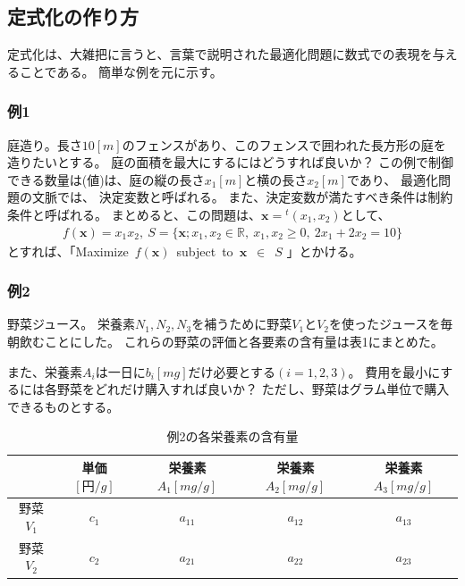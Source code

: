 \documentclass[12pt]{jarticle}
\begin{document}
\clearpage
\subsection{定式化の作り方}
定式化は、大雑把に言うと、言葉で説明された最適化問題に数式での表現を与えることである。
簡単な例を元に示す。

\subsubsection*{例1}
庭造り。長さ$10[m]$のフェンスがあり、このフェンスで囲われた長方形の庭を造りたいとする。
庭の面積を最大にするにはどうすれば良いか？
この例で制御できる数量は(値)は、庭の縦の長さ$x_1[m]$と横の長さ$x_2[m]$であり、
最適化問題の文脈では、
決定変数と呼ばれる。
また、決定変数が満たすべき条件は制約条件と呼ばれる。
まとめると、この問題は、$\boldsymbol{x}={}^t(x_1,x_2)$として、
\begin{eqnarray}
    f(\boldsymbol{x})=x_1x_2,\ S=\{\boldsymbol{x}; x_1,x_2\in \mathbb{R},\ x_1,x_2\geq 0,\ 2x_1+2x_2=10\} \nonumber
\end{eqnarray}
とすれば、「Maximize\ $f(\boldsymbol{x})$\ subject\ to\ $\boldsymbol{x}$\ $\in$\ $S$ 」とかける。


\subsubsection*{例2}
野菜ジュース。
栄養素$N_1,N_2,N_3$を補うために野菜$V_1$と$V_2$を使ったジュースを毎朝飲むことにした。
これらの野菜の評価と各要素の含有量は表1にまとめた。

また、栄養素$A_i$は一日に$b_i[mg]$だけ必要とする$(i=1,2,3)$。
費用を最小にするには各野菜をどれだけ購入すれば良いか？
ただし、野菜はグラム単位で購入できるものとする。

\begin{table}[htb]
    \begin{center}
        \caption{例2の各栄養素の含有量}
        \begin{tabular}{|c|c|c|c|c|}
            \hline
                      & 単価$[円/g]$ & 栄養素$A_1[mg/g]$ & 栄養素$A_2[mg/g]$ & 栄養素$A_3[mg/g]$ \\
            \hline
            野菜$V_1$ & $c_1$        & $a_{11}$          & $a_{12}$          & $a_{13}$          \\
            野菜$V_2$ & $c_2$        & $a_{21}$          & $a_{22}$          & $a_{23}$          \\
            \hline
        \end{tabular}
    \end{center}
\end{table}
\end{document}
